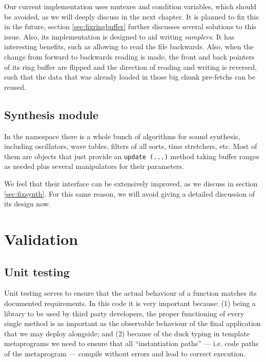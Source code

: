 Our current implementation uses mutexes and condition variables, which
should be avoided, as we will deeply discuss in the next chapter. It
is planned to fix this in the future, section \ref{sec:fixringbuffer}
further discusses several solutions to this issue. Also, its
implementation is designed to aid writing \emph{samplers}. It has
interesting benefits, such as allowing to read the file
backwards. Also, when the change from forward to backwards reading is
made, the front and back pointers of its ring buffer are flipped and
the direction of reading and writing is reversed, such that the data
that was already loaded in those big chunk pre-fetchs can be reused.

\subsection{Synthesis module}
\label{sec:ns-synth}

In the  namespace there is a whole bunch of
algorithms for sound synthesis, including oscillators, wave tables,
filters of all sorts, time stretchers, etc. Most of them are objects
that just provide an \texttt{update (...)} method taking buffer ranges
as needed plus several manipulators for their parameters.

We feel that their interface can be extensively improved, as
we discuss in section \ref{sec:fixsynth}. For this same reason, we
will avoid giving a detailed discussion of its design now.

\section{Validation}

\subsection{Unit testing}
\label{sec:sound-unittest}

Unit testing serves to ensure that the actual
behaviour of a function matches its documented requirements. In this
code it is very important because: (1) being a library to be
used by third party developers, the proper functioning of every single
method is as important as the observable behaviour of the final
application that we may deploy alongside; and (2) because of the duck
typing in template metaprograms we need to ensure that all
``instantiation paths'' --- i.e. code paths of the metaprogram ---
compile without errors and lead to correct execution.

